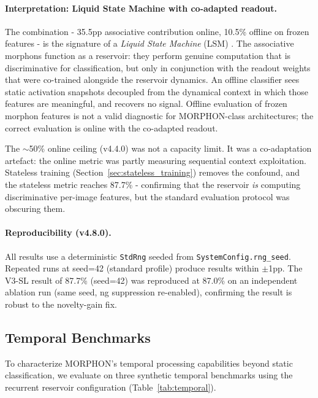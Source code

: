 \paragraph{Interpretation: Liquid State Machine with co-adapted readout.}
The combination - 35.5pp associative contribution online, 10.5\% offline on frozen features - is the signature of a \emph{Liquid State Machine} (LSM) \cite{maass2002real,lukosevicius2009reservoir}. The associative morphons function as a reservoir: they perform genuine computation that is discriminative for classification, but only in conjunction with the readout weights that were co-trained alongside the reservoir dynamics. An offline classifier sees static activation snapshots decoupled from the dynamical context in which those features are meaningful, and recovers no signal. Offline evaluation of frozen morphon features is not a valid diagnostic for MORPHON-class architectures; the correct evaluation is online with the co-adapted readout.

The $\sim$50\% online ceiling (v4.4.0) was not a capacity limit. It was a co-adaptation artefact: the online metric was partly measuring sequential context exploitation. Stateless training (Section~\ref{sec:stateless_training}) removes the confound, and the stateless metric reaches 87.7\% - confirming that the reservoir \emph{is} computing discriminative per-image features, but the standard evaluation protocol was obscuring them.

\paragraph{Reproducibility (v4.8.0).}
All results use a deterministic \texttt{StdRng} seeded from \texttt{SystemConfig.rng\_seed}. Repeated runs at seed=42 (standard profile) produce results within $\pm$1pp. The V3-SL result of 87.7\% (seed=42) was reproduced at 87.0\% on an independent ablation run (same seed, ng suppression re-enabled), confirming the result is robust to the novelty-gain fix.

\subsection{Temporal Benchmarks}
\label{sec:temporal}

To characterize MORPHON's temporal processing capabilities beyond static classification, we evaluate on three synthetic temporal benchmarks using the recurrent reservoir configuration (Table~\ref{tab:temporal}).

